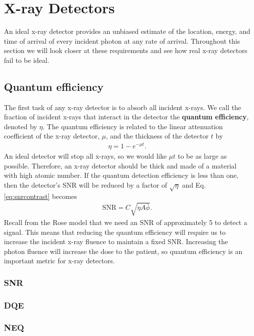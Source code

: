 \documentclass[mphy386-notes.tex]{subfiles}
\begin{document}
\section{X-ray Detectors}
An ideal x-ray detector provides an unbiased estimate of the location, energy,
and time of arrival of every incident photon at any rate of arrival. Throughout
this section we will look closer at these requirements and see how real x-ray
detectors fail to be ideal.

\subsection{Quantum efficiency}
The first task of any x-ray detector is to absorb all incident x-rays. We call
the fraction of incident x-rays that interact in the detector the
\textbf{quantum efficiency}, denoted by $\eta$. The quantum efficiency is
related to the linear attenuation coefficient of the x-ray detector, $\mu$, and
the thickness of the detector $t$ by
\begin{align}
  \eta = 1 - e^{-\mu t}. 
\end{align}
An ideal detector will stop all x-rays, so we would like $\mu t$ to be as large
as possible. Therefore, an x-ray detector should be thick and made of a material
with high atomic number. If the quantum detection efficiency is less than one,
then the detector's SNR will be reduced by a factor of $\sqrt{\eta}$ and Eq.
\ref{eq:snrcontrast} becomes
\begin{align}
  \text{SNR} = C\sqrt{\eta A\bar{\phi}} \label{eq:rosesnr}.
\end{align}
Recall from the Rose model that we need an SNR of approximately 5 to detect a
signal. This means that reducing the quantum efficiency will require us to
increase the incident x-ray fluence to maintain a fixed SNR. Increasing the
photon fluence will increase the dose to the patient, so quantum efficiency is
an important metric for x-ray detectors.

\subsubsection{SNR}
\subsubsection{DQE}
\subsubsection{NEQ}
\end{document}
